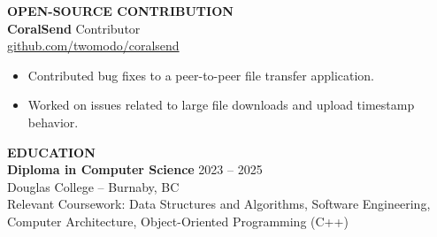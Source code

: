\documentclass[10pt,letterpaper]{article}
\begin{document}
\vspace{6pt}

\textbf{OPEN-SOURCE CONTRIBUTION}\\[4pt]

\textbf{CoralSend} \hfill Contributor\\
\href{https://github.com/twomodo/coralsend}{github.com/twomodo/coralsend}
\begin{itemize}
    \item Contributed bug fixes to a peer-to-peer file transfer application.
    \item Worked on issues related to large file downloads and upload timestamp behavior.
\end{itemize}

\vspace{6pt}

\textbf{EDUCATION}\\[4pt]

\textbf{Diploma in Computer Science} \hfill 2023 -- 2025\\
Douglas College -- Burnaby, BC\\
Relevant Coursework: Data Structures and Algorithms, Software Engineering, Computer Architecture, Object-Oriented Programming (C++)
\end{document}
